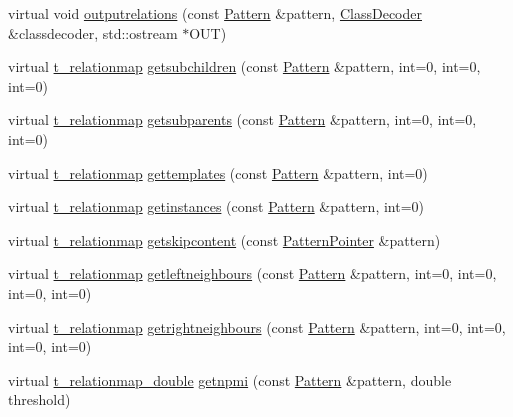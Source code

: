\begin{DoxyCompactItemize}
\item 
virtual void \hyperlink{classPatternModel_acff82b2b24874623673fad020c7c3c78}{outputrelations} (const \hyperlink{classPattern}{Pattern} \&pattern, \hyperlink{classClassDecoder}{Class\+Decoder} \&classdecoder, std\+::ostream $\ast$O\+U\+T)
\item 
virtual \hyperlink{patternmodel_8h_a8695a2b10be5a74c827cd6c11bd46fb9}{t\+\_\+relationmap} \hyperlink{classPatternModel_a08a61e3c5dcb074e9567d5fbeeaa51e7}{getsubchildren} (const \hyperlink{classPattern}{Pattern} \&pattern, int=0, int=0, int=0)
\item 
virtual \hyperlink{patternmodel_8h_a8695a2b10be5a74c827cd6c11bd46fb9}{t\+\_\+relationmap} \hyperlink{classPatternModel_ac3de813c88755705e817a6f019ae29c6}{getsubparents} (const \hyperlink{classPattern}{Pattern} \&pattern, int=0, int=0, int=0)
\item 
virtual \hyperlink{patternmodel_8h_a8695a2b10be5a74c827cd6c11bd46fb9}{t\+\_\+relationmap} \hyperlink{classPatternModel_a93b191916d48602c8b2d62aa2ff9b5ac}{gettemplates} (const \hyperlink{classPattern}{Pattern} \&pattern, int=0)
\item 
virtual \hyperlink{patternmodel_8h_a8695a2b10be5a74c827cd6c11bd46fb9}{t\+\_\+relationmap} \hyperlink{classPatternModel_af713e95d9be78c75c6a065f0f0845b19}{getinstances} (const \hyperlink{classPattern}{Pattern} \&pattern, int=0)
\item 
virtual \hyperlink{patternmodel_8h_a8695a2b10be5a74c827cd6c11bd46fb9}{t\+\_\+relationmap} \hyperlink{classPatternModel_ab0b9ea8b905ce180eec004413192abaf}{getskipcontent} (const \hyperlink{classPatternPointer}{Pattern\+Pointer} \&pattern)
\item 
virtual \hyperlink{patternmodel_8h_a8695a2b10be5a74c827cd6c11bd46fb9}{t\+\_\+relationmap} \hyperlink{classPatternModel_a6a4a0403bd746b120b405545a3ec2295}{getleftneighbours} (const \hyperlink{classPattern}{Pattern} \&pattern, int=0, int=0, int=0, int=0)
\item 
virtual \hyperlink{patternmodel_8h_a8695a2b10be5a74c827cd6c11bd46fb9}{t\+\_\+relationmap} \hyperlink{classPatternModel_a0a5cffe0dd3e29485868a3fb013746d7}{getrightneighbours} (const \hyperlink{classPattern}{Pattern} \&pattern, int=0, int=0, int=0, int=0)
\item 
virtual \hyperlink{patternmodel_8h_ae13b52c8cf777358f19da17c90c7dac0}{t\+\_\+relationmap\+\_\+double} \hyperlink{classPatternModel_a3439e0f9443ff0aeb551ca2b09486f7c}{getnpmi} (const \hyperlink{classPattern}{Pattern} \&pattern, double threshold)
\item 

\end{DoxyCompactItemize}
